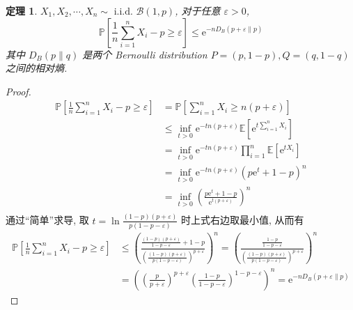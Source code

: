 \documentclass[8pt]{article}
\theoremstyle{compact}
\newtheorem{theorem}{定理}[section]
\def\le{\leqslant}
\def\ge{\geqslant}
\def\P#1{\mathbb{P}\left[{#1}\right]}
\def\E#1{\mathbb{E}\left[{#1}\right]}
\def\e{\mathrm{e}}
\begin{document}
\begin{theorem}
	$X_1, X_2, \cdots, X_n \sim \text{ i.i.d. } \mathcal B(1, p)$, 对于任意 $\varepsilon > 0$, $$\P{\frac1n\sum_{i=1}^nX_i - p \ge \varepsilon} \le \e^{-nD_B(p + \varepsilon \| p)}$$
	其中 $D_B(p \| q)$ 是两个 Bernoulli distribution $P = (p, 1 - p), Q = (q, 1 - q)$ 之间的相对熵.
	\label{chernoff-bound-1}
\end{theorem}
\begin{proof}
	\begin{equation*}
		\begin{split}
			\P{\frac1n \sum_{i=1}^{n}X_i - p \ge \varepsilon} &=\P{\sum_{i=1}^{n}X_i \ge n(p + \varepsilon)}\\
			&\le \inf_{t > 0}\e^{-tn(p + \varepsilon)}\E{\e^{t\sum_{i=1}^nX_i}}\\
			&= \inf_{t > 0}\e^{-tn(p + \varepsilon)}\prod_{i=1}^{n}\E{\e^{tX_i}}\\
			&= \inf_{t > 0}\e^{-tn(p + \varepsilon)}(p\e^t + 1 - p)^n\\
			&= \inf_{t > 0}\left(\frac{p\e^t + 1 - p}{\e^{t(p + \varepsilon)}}\right)^n\\
		\end{split}
	\end{equation*}
	通过“简单”求导, 取 $t = \ln\frac{(1 - p)(p + \varepsilon)}{p(1 - p - \varepsilon)}$ 时上式右边取最小值, 从而有
	\begin{equation*}
		\begin{split}
			\P{\frac1n \sum_{i=1}^{n}X_i - p \ge \varepsilon} &\le \left(\frac{\frac{(1-p)(p+\varepsilon)}{1-p-\varepsilon}+1-p}{\left(\frac{(1-p)(p+\varepsilon)}{p(1-p-\varepsilon)}\right)^{p+\varepsilon}}\right)^n = \left(\frac{\frac{1-p}{1-p-\varepsilon}}{\left(\frac{(1-p)(p+\varepsilon)}{p(1-p-\varepsilon)}\right)^{p+\varepsilon}}\right)^n \\&= \left(\left(\frac{p}{p+\varepsilon}\right)^{p+\varepsilon}\left(\frac{1-p}{1-p-\varepsilon}\right)^{1-p-\varepsilon}\right)^n = \e^{-nD_B(p+\varepsilon \| p)}
		\end{split}
	\end{equation*}
\end{proof}
\end{document}
